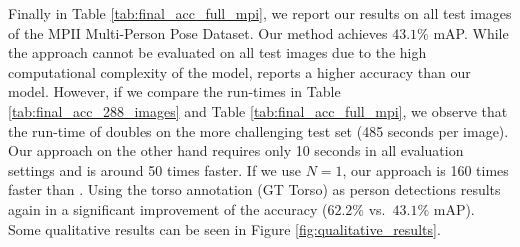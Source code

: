 \documentclass[runningheads]{llncs}
\begin{document}
Finally in Table \ref{tab:final_acc_full_mpi}, we report our results on all test images of the MPII Multi-Person Pose Dataset. Our method achieves $43.1\%$ mAP. While the approach \cite{pishchulin2015deepcut} cannot be evaluated on all test images due to the high computational complexity of the model, \cite{insafutdinov2016deepercut} reports a higher accuracy than our model. However, if we compare the run-times in Table \ref{tab:final_acc_288_images} and Table \ref{tab:final_acc_full_mpi}, we observe that the run-time of \cite{insafutdinov2016deepercut} doubles on the more challenging test set (485 seconds per image). Our approach on the other hand requires only 10 seconds in all evaluation settings and is around 50 times faster. If we use $N=1$, our approach is 160 times faster than \cite{insafutdinov2016deepercut}. Using the torso annotation (GT Torso) as person detections results again in a significant improvement of the accuracy ($62.2\%$ vs.~$43.1\%$ mAP). Some qualitative results can be seen in Figure \ref{fig:qualitative_results}.
\end{document}
